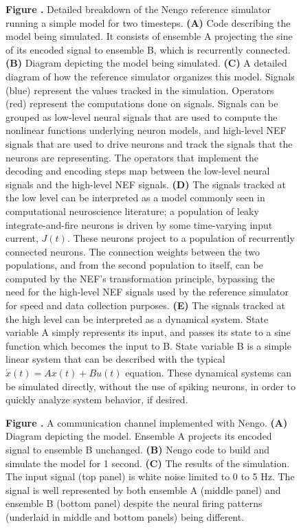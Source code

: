\documentclass{frontiersSCNS}
\begin{document}
\begin{figure}
 \textbf{\label{fig:sim} Figure .}{
   Detailed breakdown of the Nengo reference simulator
   running a simple model for two timesteps.
   \textbf{(A)} Code describing the model being simulated.
   It consists of ensemble A projecting the sine of its
   encoded signal to ensemble B,
   which is recurrently connected.
   \textbf{(B)} Diagram depicting the model being simulated.
   \textbf{(C)} A detailed diagram of how the reference simulator
   organizes this model. Signals (blue) represent the values
   tracked in the simulation.
   Operators (red) represent the computations done on signals.
   Signals can be grouped as low-level neural signals
   that are used to compute the nonlinear functions
   underlying neuron models,
   and high-level NEF signals that are used to
   drive neurons and track the signals
   that the neurons are representing.
   The operators that implement the decoding
   and encoding steps map between
   the low-level neural signals
   and the high-level NEF signals.
   \textbf{(D)} The signals tracked at the low level
   can be interpreted as a model
   commonly seen in computational neuroscience literature;
   a population of leaky integrate-and-fire neurons
   is driven by some time-varying input current, $J(t)$.
   These neurons project to a population
   of recurrently connected neurons.
   The connection weights between the two populations,
   and from the second population to itself,
   can be computed by the NEF's transformation
   principle, bypassing the need for
   the high-level NEF signals
   used by the reference simulator
   for speed and data collection purposes.
   \textbf{(E)} The signals tracked at the high level
   can be interpreted as a dynamical system.
   State variable A simply represents its input,
   and passes its state to a sine function
   which becomes the input to B.
   State variable B is a simple linear system
   that can be described with the typical
   $\dot{x}(t) = A x(t) + B u(t)$ equation.
   These dynamical systems can be simulated
   directly, without the use of spiking neurons,
   in order to quickly analyze system behavior,
   if desired.}
\end{figure}

\begin{figure}
 \textbf{\label{fig:comm-channel}
   Figure .}{
   A communication channel implemented with Nengo.
   \textbf{(A)} Diagram depicting the model. Ensemble A
   projects its encoded signal to ensemble B unchanged.
   \textbf{(B)} Nengo code to build and simulate the model
   for 1 second.
   \textbf{(C)} The results of the simulation.
   The input signal (top panel) is white noise limited to 0 to 5 Hz.
   The signal is well represented by both ensemble A (middle panel)
   and ensemble B (bottom panel) despite the neural firing patterns
   (underlaid in middle and bottom panels) being different.}
\end{figure}
\end{document}
